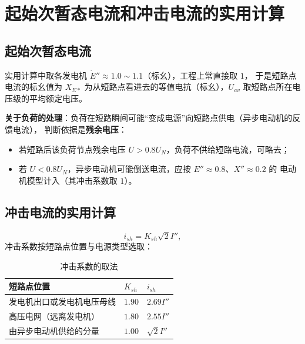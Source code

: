 
\section{起始次暂态电流和冲击电流的实用计算}

\subsection{起始次暂态电流}

实用计算中取各发电机 $\dot E''\approx1.0\sim1.1$（标幺），工程上常直接取 $1$，
于是短路点电流的标幺值为
$X_{\Sigma*}$ 为从短路点看进去的等值电抗（标幺），$U_{av}$ 取短路点所在电压级的平均额定电压。

\textbf{关于负荷的处理}：负荷在短路瞬间可能“变成电源”向短路点供电（异步电动机的反馈电流），
判断依据是\textbf{残余电压}：
\begin{itemize}
  \item 若短路后该负荷节点残余电压 $U>0.8U_N$，负荷不供给短路电流，可略去；
  \item 若 $U<0.8U_N$，异步电动机可能倒送电流，应按 $E''\approx0.8$、$X''\approx0.2$ 的
        电动机模型计入（其冲击系数取 $1$）。
\end{itemize}

\subsection{冲击电流的实用计算}

\begin{equation}
  i_{sh}=K_{sh}\sqrt{2}I'' ,
\end{equation}
冲击系数按短路点位置与电源类型选取：

\begin{table}[htbp]
  \centering
  \caption{冲击系数的取法}
  \small
  \begin{tabular}{@{}lll@{}}
    \toprule
    短路点位置 & $K_{sh}$ & $i_{sh}$ \\
    \midrule
    发电机出口或发电机电压母线 & $1.90$ & $2.69I''$ \\
    高压电网（远离发电机） & $1.80$ & $2.55I''$ \\
    由异步电动机供给的分量 & $1.00$ & $\sqrt{2}I''$ \\
    \bottomrule
  \end{tabular}
\end{table}

